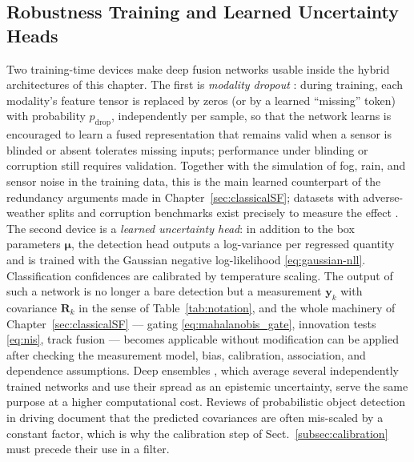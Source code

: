 \documentclass[graybox,envcountchap]{style/SNmono}
\providecommand{\DIFadd}[1]{{\protect\color{blue} #1}} %
\providecommand{\DIFdel}[1]{{\protect\color{red} #1}} %
\providecommand{\DIFaddbegin}{} %
\providecommand{\DIFaddend}{} %
\providecommand{\DIFdelbegin}{} %
\providecommand{\DIFdelend}{} %
\begin{document}
\subsection{Robustness Training and Learned Uncertainty Heads}
\label{subsec:robustness-uncertainty-heads}
Two training-time devices make deep fusion networks usable inside the hybrid architectures of this chapter. The first is \emph{modality dropout} \cite{neverova2016_moddrop}: during training, each modality's feature tensor is replaced by zeros (or by a learned ``missing'' token) with probability $p_{\mathrm{drop}}$, independently per sample, so that the network \DIFdelbegin \DIFdel{learns }\DIFdelend \DIFaddbegin \DIFadd{is encouraged to learn }\DIFaddend a fused representation that \DIFdelbegin \DIFdel{remains valid when a sensor is blinded or absent}\DIFdelend \DIFaddbegin \DIFadd{tolerates missing inputs; performance under blinding or corruption still requires validation}\DIFaddend . Together with the simulation of fog, rain, and sensor noise in the training data, this is the main learned counterpart of the redundancy arguments made in Chapter~\ref{sec:classicalSF}; datasets with adverse-weather splits and corruption benchmarks exist precisely to measure the effect \cite{bijelic2020_stf,dong2023_robobev}. The second device is a \emph{learned uncertainty head}: in addition to the box parameters $\boldsymbol{\mu}$, the detection head outputs a log-variance per regressed quantity and is trained with the Gaussian negative log-likelihood \eqref{eq:gaussian-nll}. Classification confidences are calibrated by temperature scaling. The output of such a network is no longer a bare detection but a measurement $\mathbf{y}_k$ with covariance $\mathbf{R}_k$ in the sense of Table~\ref{tab:notation}, and the whole machinery of Chapter~\ref{sec:classicalSF} --- gating \eqref{eq:mahalanobis_gate}, innovation tests \eqref{eq:nis}, track fusion --- \DIFdelbegin \DIFdel{becomes applicable without modification}\DIFdelend \DIFaddbegin \DIFadd{can be applied after checking the measurement model, bias, calibration, association, and dependence assumptions}\DIFaddend . Deep ensembles \cite{lakshminarayanan2017_ensembles}, which average several independently trained networks and use their spread as an epistemic uncertainty, serve the same purpose at a higher computational cost. Reviews of probabilistic object detection in driving \cite{feng2021_probabilistic_od} document that the predicted covariances are often mis-scaled by a constant factor, which is why the calibration step of Sect.~\ref{subsec:calibration} must precede their use in a filter.
\end{document}
